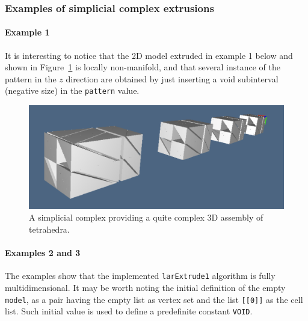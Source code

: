 \documentclass[11pt,oneside]{article}	%
\begin{document}
\subsubsection{Examples of simplicial complex extrusions}

\paragraph{Example 1}
It is interesting to notice that the 2D model extruded in example 1 below and shown in Figure~\ref{fig:assembly} is locally non-manifold, and that several instance of the pattern in the $z$ direction are obtained by just inserting a void subinterval (negative size) in the \texttt{pattern} value.

\begin{figure}[htbp] %
   \centering
   \includegraphics[width=0.7\linewidth]{images/assembly} 
   \caption{A simplicial complex providing a quite complex 3D assembly of tetrahedra.}
   \label{fig:assembly}
\end{figure}

\paragraph{Examples 2 and 3}
The examples show that the implemented \texttt{larExtrude1} algorithm is fully multidimensional. 
It may be worth noting the initial definition of the empty \texttt{model}, as a pair having the empty list as vertex set and the list \texttt{[[0]]} as the cell list. Such initial value is used
to define a predefinite constant \texttt{VOID}.
\end{document}
